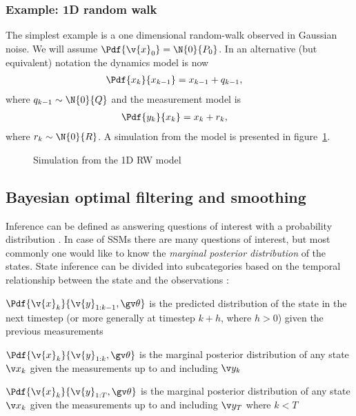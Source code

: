 \subsubsection*{Example: 1D random walk}
The simplest example is a one dimensional random-walk observed in Gaussian noise.
We will assume $\Pdf{\v{x}_0}=\N{0}{P_0}$. In an alternative (but equivalent) notation
the dynamics model is now
\begin{align}
	\Pdf{x_k}{x_{k-1}}&=x_{k-1}+q_{k-1},
\end{align}
where $q_{k-1}\sim \N{0}{Q}$ and the measurement model is
\begin{align}
	\Pdf{y_k}{x_{k}}&=x_{k}+r_{k},
\end{align}
where $r_{k}\sim \N{0}{R}$. A simulation from the model is presented in figure~\ref{fig:rw1d}.

\begin{figure}[htp]
\begin{center}
  \caption{Simulation from the 1D RW model}
  \label{fig:rw1d}
\end{center}
\end{figure}


\subsection{Bayesian optimal filtering and smoothing}

Inference can be defined as answering questions of interest with a probability distribution \parencite{barber2011bayesian}.
In case of SSMs there are many questions of interest, but most commonly one would
like to know the \emph{marginal posterior distribution} of the states. State inference
can be divided into subcategories based on the temporal relationship between the state
and the observations \parencite{Sarkka2006}:
\begin{description}
\addtolength{\leftskip}{1cm}
	\item[Predictive distribution]
	$\Pdf{\v{x}_{k}}{\v{y}_{1:k-1},\Th}$ is the predicted distribution of the state in the next timestep (or more generally at timestep $k+h$, where $h>0$) 
	given the previous measurements
	\item[Filtering distribution] $\Pdf{\v{x}_k}{\v{y}_{1:k},\Th}$ is the marginal posterior distribution
	of any state $\xk$ given the measurements up to and including $\yk$
	\item[Smoothing distribution]
	$\Pdf{\v{x}_k}{\v{y}_{1:T},\Th}$ is the marginal posterior distribution
	of any state $\xk$ given the measurements up to and including $\y_T$ where $k<T$
\end{description} 


